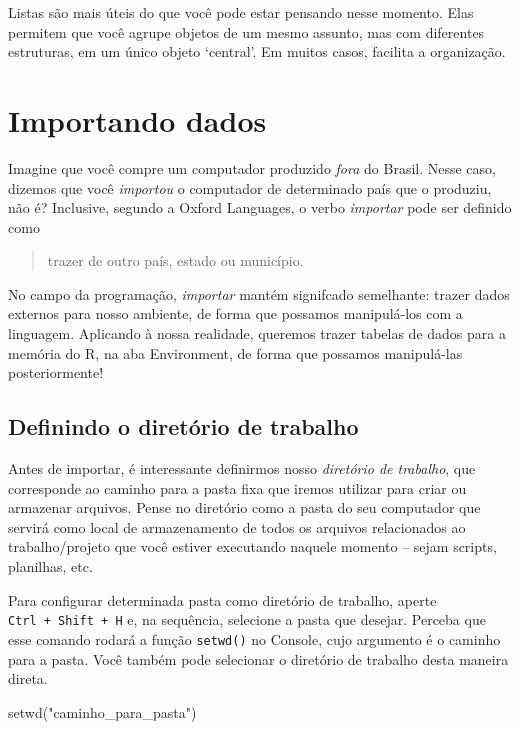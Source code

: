 \documentclass[
  letterpaper,
  DIV=11,
  numbers=noendperiod]{scrreprt}
\newenvironment{Shaded}{\begin{snugshade}}{\end{snugshade}}
\newcommand{\FunctionTok}[1]{\textcolor[rgb]{0.28,0.35,0.67}{#1}}
\newcommand{\NormalTok}[1]{\textcolor[rgb]{0.00,0.23,0.31}{#1}}
\newcommand{\StringTok}[1]{\textcolor[rgb]{0.13,0.47,0.30}{#1}}
\begin{document}
Listas são mais úteis do que você pode estar pensando nesse momento.
Elas permitem que você agrupe objetos de um mesmo assunto, mas com
diferentes estruturas, em um único objeto `central'. Em muitos casos,
facilita a organização.

\chapter{Importando dados}\label{importando-dados}

Imagine que você compre um computador produzido \emph{fora} do Brasil.
Nesse caso, dizemos que você \emph{importou} o computador de determinado
país que o produziu, não é? Inclusive, segundo a Oxford Languages, o
verbo \emph{importar} pode ser definido como

\begin{quote}
trazer de outro país, estado ou município.
\end{quote}

No campo da programação, \emph{importar} mantém signifcado semelhante:
trazer dados externos para nosso ambiente, de forma que possamos
manipulá-los com a linguagem. Aplicando à nossa realidade, queremos
trazer tabelas de dados para a memória do R, na aba Environment, de
forma que possamos manipulá-las posteriormente!

\section{Definindo o diretório de
trabalho}\label{definindo-o-diretuxf3rio-de-trabalho}

Antes de importar, é interessante definirmos nosso \emph{diretório de
trabalho}, que corresponde ao caminho para a pasta fixa que iremos
utilizar para criar ou armazenar arquivos. Pense no diretório como a
pasta do seu computador que servirá como local de armazenamento de todos
os arquivos relacionados ao trabalho/projeto que você estiver executando
naquele momento -- sejam scripts, planilhas, etc.

Para configurar determinada pasta como diretório de trabalho, aperte
\texttt{Ctrl\ +\ Shift\ +\ H} e, na sequência, selecione a pasta que
desejar. Perceba que esse comando rodará a função \texttt{setwd()} no
Console, cujo argumento é o caminho para a pasta. Você também pode
selecionar o diretório de trabalho desta maneira direta.

\begin{Shaded}
\begin{Highlighting}[]
\FunctionTok{setwd}\NormalTok{(}\StringTok{"caminho\_para\_pasta"}\NormalTok{)}
\end{Highlighting}
\end{Shaded}
\end{document}

